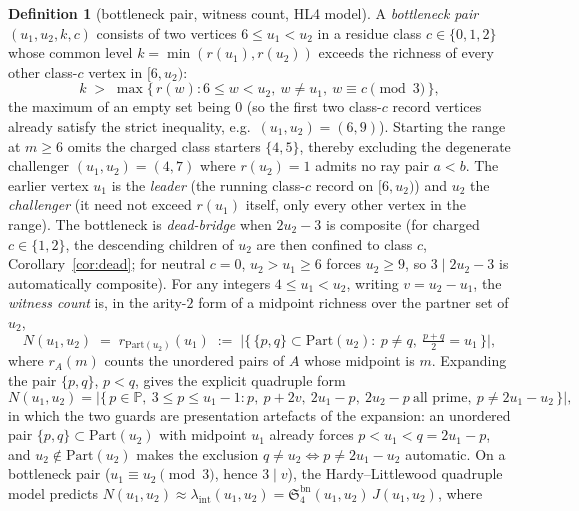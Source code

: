 \documentclass[11pt]{article}
\theoremstyle{plain}
\theoremstyle{definition}
\newtheorem{definition}[theorem]{Definition}
\newcommand{\rch}{r}
\newcommand{\lam}{\lambda_{\mathrm{int}}}
\begin{document}
\begin{definition}[bottleneck pair, witness count, HL4 model]
\label{def:bottleneck}
A \emph{bottleneck pair} $(u_1,u_2,k,c)$ consists of two vertices
$6 \le u_1 < u_2$ in a residue class $c \in \{0,1,2\}$ whose
common level $k = \min(\rch(u_1),\rch(u_2))$ exceeds the richness
of every other class-$c$ vertex in $[6, u_2)$:
\[
k \;>\; \max\{\,\rch(w) : 6 \le w < u_2,\ w \neq u_1,\ w \equiv c
   \pmod 3\,\},
\]
the maximum of an empty set being $0$ (so the first two
class-$c$ record vertices already satisfy the strict
inequality, e.g.\ $(u_1,u_2) = (6,9)$). Starting the range at
$m \ge 6$ omits the charged class starters $\{4,5\}$, thereby
excluding the degenerate challenger $(u_1,u_2) = (4,7)$ where
$\rch(u_2) = 1$ admits no ray pair $a < b$. The earlier
vertex $u_1$ is the \emph{leader} (the running class-$c$ record
on $[6, u_2)$) and $u_2$ the \emph{challenger} (it need not exceed
$\rch(u_1)$ itself, only every other vertex in the range). The
bottleneck is \emph{dead-bridge} when $2u_2 - 3$ is composite (for
charged $c \in \{1,2\}$, the descending children of $u_2$ are then
confined to class $c$, Corollary~\ref{cor:dead}; for neutral
$c = 0$, $u_2 > u_1 \ge 6$ forces $u_2 \ge 9$, so
$3 \mid 2u_2 - 3$ is automatically composite). For any integers
$4 \le u_1 < u_2$, writing $v = u_2 - u_1$, the \emph{witness count}
is, in the arity-$2$ form of a midpoint richness over the partner
set of $u_2$,
\begin{equation}\label{eq:arity2}
N(u_1,u_2)
 \;=\; r_{\mathrm{Part}(u_2)}(u_1)
 \;:=\; \bigl|\bigl\{\, \{p,q\} \subset \mathrm{Part}(u_2) :\
   p \neq q,\ \tfrac{p+q}{2} = u_1 \,\bigr\}\bigr|,
\end{equation}
where $r_A(m)$ counts the unordered pairs of $A$ whose midpoint
is $m$. Expanding the pair $\{p,q\}$, $p < q$, gives the explicit
quadruple form
\[
N(u_1,u_2) = \bigl|\{\,p \in \mathbb{P},\ 3 \le p \le u_1 - 1 :
   p,\ p + 2v,\ 2u_1 - p,\ 2u_2 - p \ \text{all prime},\
   p \neq 2u_1 - u_2 \,\}\bigr|,
\]
in which the two guards are presentation artefacts of the
expansion: an unordered pair $\{p,q\} \subset \mathrm{Part}(u_2)$
with midpoint $u_1$ already forces $p < u_1 < q = 2u_1 - p$, and
$u_2 \notin \mathrm{Part}(u_2)$ makes the exclusion
$q \neq u_2 \iff p \neq 2u_1 - u_2$ automatic. On a bottleneck pair
($u_1 \equiv u_2 \pmod 3$, hence $3 \mid v$), the Hardy--Littlewood
quadruple model predicts
$N(u_1,u_2) \approx \lam(u_1,u_2)
= \mathfrak{S}_4^{\mathrm{bn}}(u_1,u_2)\,J(u_1,u_2)$, where
\begin{align*}

\end{align*}
\end{definition}
\end{document}
